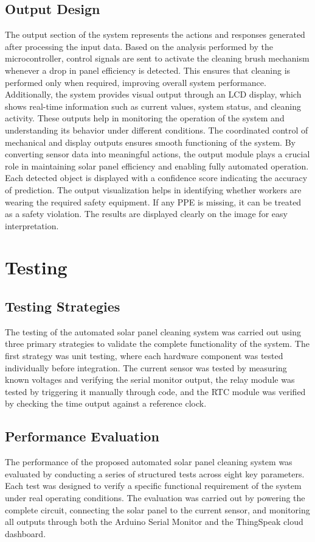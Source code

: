 \documentclass[10pt]{report}
\begin{document}
\begin{sloppypar}
{{{\begin{sloppypar}
\subsection{Output Design}
\hspace{0.5cm}
The output section of the system represents the actions and responses generated after
processing the input data. Based on the analysis performed by the microcontroller,
control signals are sent to activate the cleaning brush mechanism whenever a drop
in panel efficiency is detected. This ensures that cleaning is performed only when
required, improving overall system performance. Additionally, the system provides
visual output through an LCD display, which shows real-time information such as
current values, system status, and cleaning activity. These outputs help in monitoring the operation of the system and understanding its behavior under different conditions. The coordinated control of mechanical and display outputs ensures smooth
functioning of the system. By converting sensor data into meaningful actions, the
output module plays a crucial role in maintaining solar panel efficiency and enabling
fully automated operation.
Each detected object is displayed with a confidence score indicating the accuracy of prediction. The output visualization helps in identifying whether workers are
wearing the required safety equipment. If any PPE is missing, it can be treated as a
safety violation. The results are displayed clearly on the image for easy interpretation.
\section{Testing}
\subsection{Testing Strategies}
\hspace{0.5cm}
The testing of the automated solar panel cleaning system was carried out using three
primary strategies to validate the complete functionality of the system. The first strategy was unit testing, where each hardware component was tested individually before
integration. The current sensor was tested by measuring known voltages and verifying the serial monitor output, the relay module was tested by triggering it manually
through code, and the RTC module was verified by checking the time output against
a reference clock.
\subsection{Performance Evaluation}
\hspace{0.5cm}
The performance of the proposed automated solar panel cleaning system was evaluated by conducting a series of structured tests across eight key parameters. Each test
was designed to verify a specific functional requirement of the system under real operating conditions. The evaluation was carried out by powering the complete circuit,
connecting the solar panel to the current sensor, and monitoring all outputs through
both the Arduino Serial Monitor and the ThingSpeak cloud dashboard.


\end{sloppypar}}}}
\end{sloppypar}
\end{document}
